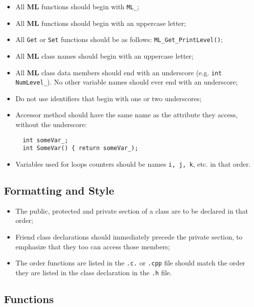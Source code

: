 \documentclass[10pt,letter,relax]{SANDreport}
\newcommand{\ML}     {{\bf ML }}
\begin{document}
\begin{itemize}
\item All \ML functions should begin with \verb!ML_!;
\item All \ML functions should begin with an uppercase letter;
\item All \verb!Get! or \verb!Set! functions should be as follows:
\verb!ML_Get_PrintLevel()!;
\item All \ML class names should begin with an uppercase letter;
\item All \ML class data members should end with an underscore (e.g. \verb!int NumLevel_!).
No other variable names should ever end with an underscore;
\item Do not use identifiers that begin with one or two underscores;
\item Accessor method should have the same name as the attribute they access,
  without the underscore:
  \begin{verbatim}
  int someVar_;
  int SomeVar() { return someVar_);
  \end{verbatim}
\item Variables used for loops counters should be names \verb!i, j, k!, etc.
  in that order. 
\end{itemize}

\subsection{Formatting and Style}

\begin{itemize}
\item The public, protected and private section of a class are to be declared
  in that order;
\item Friend class declarations should immediately precede the private
  section, to emphasize that they too can access those members;
\item The order functions are listed in the \verb!.c.! or \verb!.cpp! file
  should match the order they are listed in the class declaration in the
  \verb!.h! file.
\end{itemize}

\subsection{Functions}
\end{document}
